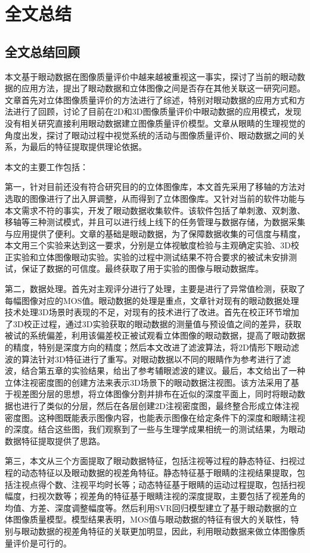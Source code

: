 \chapter{全文总结}
\section{全文总结回顾}
本文基于眼动数据在图像质量评价中越来越被重视这一事实，探讨了当前的眼动数据的应用方法，提出了眼动数据和立体图像之间是否存在其他关联这一研究问题。文章首先对立体图像质量评价的方法进行了综述，特别对眼动数据的应用方式和方法进行了回顾，讨论了目前在2D和3D图像质量评价中眼动数据的应用模式，发现没有相关研究直接利用眼动数据建立图像质量评价模型。文章从眼睛的生理视觉的角度出发，探讨了眼动过程中视觉系统的活动与图像质量评价、眼动数据之间的关系，为最后的特征提取提供理论依据。

本文的主要工作包括：

第一，针对目前还没有符合研究目的的立体图像库，本文首先采用了移轴的方法对选取的图像进行了出入屏调整，从而得到了立体图像库。又针对当前的软件功能与本文需求不符的事实，开发了眼动数据收集软件。该软件包括了单刺激、双刺激、移轴等三种测试模式，并且可以进行线上线下的任务管理与数据存储，为数据采集与应用提供了便利。文章的基础是眼动数据，为了保障数据收集的可信度与精度，本文用三个实验来达到这一要求，分别是立体视敏度检验与主观确定实验、3D校正实验和立体图像眼动实验。实验的过程中测试结果不符合要求的被试未安排测试，保证了数据的可信度。最终获取了用于实验的图像与眼动数据库。

第二，数据处理。首先对主观评分进行了处理，主要是进行了异常值检测，获取了每幅图像对应的MOS值。眼动数据的处理是重点，文章针对现有的眼动数据处理技术处理3D场景时表现的不足，对现有的技术进行了改进。首先在校正环节增加了3D校正过程，通过3D实验获取的眼动数据的测量值与预设值之间的差异，获取被试的系统偏差，利用该偏差校正被试观看立体图像的眼动数据，提高了眼动数据的精度，特别是深度方向的精度；然后本文改进了滤波算法，将2D情形下眼动滤波的算法针对3D特征进行了重写。对眼动数据以不同的眼睛作为参考进行了滤波，结合第五章的实验结果，给出了参考辅眼滤波的建议。最后，本文给出了一种立体注视密度图的创建方法来表示3D场景下的眼动数据注视图。该方法采用了基于视差图分层的思想，将立体图像分割并排布在近似的深度平面上，同时将眼动数据也进行了类似的分层，然后在各层创建2D注视密度图，最终整合形成立体注视密度图。这种图既能表示图像内容，也能表示图像在给定条件下的深度和眼睛注视的深度。结合这些图，我们观察到了一些与生理学成果相统一的测试结果，为眼动数据特征提取提供了思路。

第三，本文从三个方面提取了眼动数据特征，包括注视等过程的静态特征、扫视过程的动态特征以及眼动数据的视差角特征。静态特征基于眼睛的注视结果提取，包括注视点得个数、注视平均时长等；动态特征基于眼睛的运动过程提取，包括扫视幅度，扫视次数等；视差角的特征基于眼睛注视的深度提取，主要包括了视差角的均值、方差、深度调整幅度等。然后利用SVR回归模型建立了基于眼动数据的立体图像质量模型。模型结果表明，MOS值与眼动数据的特征有很大的关联性，特别与眼动数据的视差角特征的关联更加明显，因此，利用眼动数据来做立体图像质量评价是可行的。

